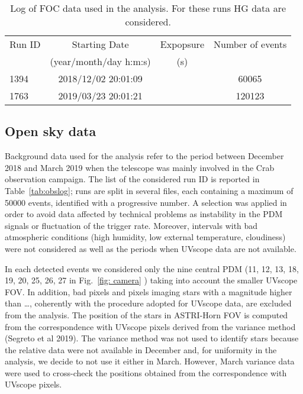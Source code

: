 \begin{table*}[htbp!!]
\centering
\caption{Log of FOC data used in the analysis. For these runs HG data are considered. }
\label{tab:FOC}
\begin{tabular}{lccc}
\hline\hline
Run ID & Starting Date &  Expopsure & Number of events \\
               & (year/month/day h:m:s) & (s)   \\
\hline     
1394 & 2018/12/02 20:01:09  &  & 60065     \\
1763 & 2019/03/23 20:01:21  &  & 120123    \\ 
\hline\hline
\end{tabular}
\end{table*}

\subsection{Open sky data} 
\label{subs:skydata}

Background data used for the analysis refer to the period between December 2018 and March 2019 when the telescope was mainly involved in the Crab observation campaign. The list of the considered run ID is reported in Table~\ref{tab:obslog}; runs are split in several files, each containing a maximum of 50000 events, identified with a progressive number.
A selection was applied in order to avoid data affected by technical problems as instability in the PDM signals or fluctuation of the trigger rate. Moreover, intervals with bad atmospheric conditions 
(high humidity, low external temperature, cloudiness) were not considered as well as the periods when UVscope data are not available.

In each detected events we considered only the nine central PDM (11, 12, 13, 18, 19, 20, 25, 26, 27 in Fig.~\ref{fig: camera} ) taking into account the smaller UVscope FOV.  In addition, bad pixels and pixels imaging stars with a magnitude higher than …, coherently with the procedure adopted for UVscope data, are excluded from the analysis. The position of the stars in ASTRI-Horn FOV is computed from the correspondence with UVscope pixels derived from the variance method (Segreto et al 2019). 
The variance method was not used to identify stars because the relative data were not available in December and, for uniformity in the analysis, we decide to not use it either in March.  However, March variance data were used to cross-check the positions obtained from the correspondence with UVscope pixels.

